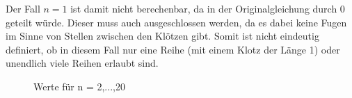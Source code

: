 \documentclass[a4paper, notitlepage, 12pt]{scrartcl}
\DeclarePairedDelimiter\floor{\lfloor}{\rfloor}
\begin{document}
Der Fall $ n = 1$ ist damit nicht berechenbar, da in der Originalgleichung durch 0 geteilt würde. Dieser muss auch ausgeschlossen werden, da es dabei keine Fugen im Sinne von Stellen zwischen den Klötzen gibt. Somit ist nicht eindeutig definiert, ob in diesem Fall nur eine Reihe (mit einem Klotz der Länge 1) oder unendlich viele Reihen erlaubt sind.
\\
\begin{figure}[H]
\begin{center}
\end{center}
\caption{Werte für n = 2,...,20}
\end{figure}
\end{document}
